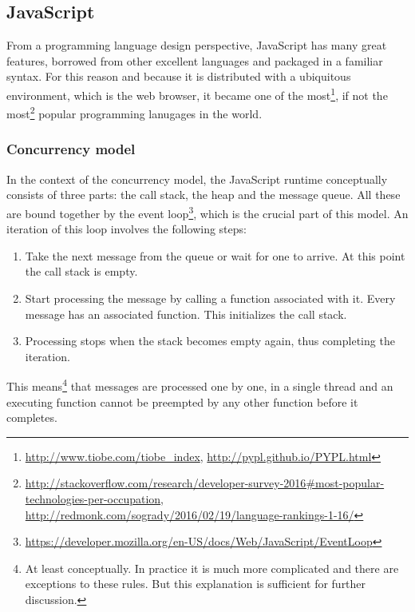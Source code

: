 \subsection{JavaScript}
From a programming language design perspective, JavaScript has many great
features, borrowed from other excellent languages and packaged in a familiar
syntax. For this reason and because it is distributed with a ubiquitous
environment, which is the web browser, it became one of the
most\footnote{\url{http://www.tiobe.com/tiobe_index},
  \url{http://pypl.github.io/PYPL.html}}, if not the
most\footnote{\url{http://stackoverflow.com/research/developer-survey-2016\#most-popular-technologies-per-occupation},
  \url{http://redmonk.com/sogrady/2016/02/19/language-rankings-1-16/}} popular
programming lanugages in the world.

\subsubsection{Concurrency model}
In the context of the concurrency model, the JavaScript runtime conceptually
consists of three parts: the call stack, the heap and the message queue. All
these are bound together by the event
loop\footnote{\url{https://developer.mozilla.org/en-US/docs/Web/JavaScript/EventLoop}},
which is the crucial part of this model.  An iteration of this loop involves the
following steps:
\begin{enumerate}
	\item Take the next message from the queue or wait for one to arrive. At
          this point the call stack is empty.
	\item Start processing the message by calling a function associated with
          it. Every message has an associated function. This initializes the
          call stack.
	\item Processing stops when the stack becomes empty again, thus
          completing the iteration.
\end{enumerate}

This means\footnote{At least conceptually. In practice it is much more
  complicated and there are exceptions to these rules. But this explanation is
  sufficient for further discussion.}
 that messages are processed one by one, in
a single thread and an executing function cannot be preempted by any other
function before it completes.

